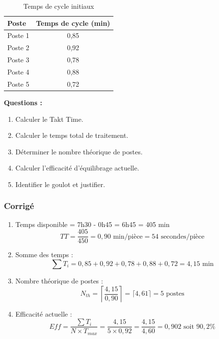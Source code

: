 \documentclass[12pt,a4paper]{article}
\begin{document}
\begin{center}
\begin{table}[H]
\centering
\begin{tabular}{|l|c|}
\hline
\textbf{Poste} & \textbf{Temps de cycle (min)} \\ \hline
Poste 1 & 0,85 \\
Poste 2 & 0,92 \\
Poste 3 & 0,78 \\
Poste 4 & 0,88 \\
Poste 5 & 0,72 \\ \hline
\end{tabular}
\caption{Temps de cycle initiaux}
\label{tab:ex1_temps}
\end{table}

\textbf{Questions :}
\begin{enumerate}
    \item Calculer le Takt Time.
    \item Calculer le temps total de traitement.
    \item Déterminer le nombre théorique de postes.
    \item Calculer l'efficacité d'équilibrage actuelle.
    \item Identifier le goulot et justifier.
\end{enumerate}

\subsubsection{Corrigé}
\begin{enumerate}
    \item Temps disponible = 7h30 - 0h45 = 6h45 = 405 min \\
    \[
    TT = \frac{405}{450} = 0,90 \text{ min/pièce} = 54 \text{ secondes/pièce}
    \]
    
    \item Somme des temps : \\
    \[
    \sum T_i = 0,85 + 0,92 + 0,78 + 0,88 + 0,72 = 4,15 \text{ min}
    \]
    
    \item Nombre théorique de postes : \\
    \[
    N_{th} = \left\lceil \frac{4,15}{0,90} \right\rceil = \lceil 4,61 \rceil = 5 \text{ postes}
    \]
    
    \item Efficacité actuelle : \\
    \[
    Eff = \frac{\sum T_i}{N \times T_{max}} = \frac{4,15}{5 \times 0,92} = \frac{4,15}{4,60} = 0,902 \text{ soit } 90,2\%
    \]
    

\end{enumerate}
\end{center}
\end{document}
